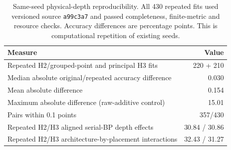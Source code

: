 \begin{table}[tbp]
\centering
\caption{Same-seed physical-depth reproducibility. All 430 repeated fits used versioned source \texttt{a99c3a7} and passed completeness, finite-metric and resource checks. Accuracy differences are percentage points. This is computational repetition of existing seeds.}
\label{tab:physical_reproducibility}
\small
\begin{tabular}{lr}
\toprule
Measure & Value \\
\midrule
Repeated H2/grouped-point and principal H3 fits & 220 + 210 \\
Median absolute original/repeated accuracy difference & 0.030 \\
Mean absolute difference & 0.154 \\
Maximum absolute difference (raw-additive control) & 15.01 \\
Pairs within 0.1 points & 357/430 \\
Repeated H2/H3 aligned serial-BP depth effects & 30.84 / 30.86 \\
Repeated H2/H3 architecture-by-placement interactions & 32.43 / 31.27 \\
\bottomrule
\end{tabular}
\end{table}

